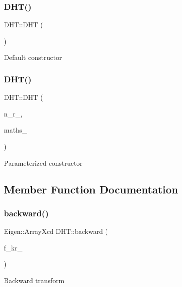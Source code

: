 \subsubsection{\texorpdfstring{D\+H\+T()}{DHT()}\hspace{0.1cm}{\footnotesize\ttfamily [1/2]}}
{\footnotesize\ttfamily D\+H\+T\+::\+D\+HT (\begin{DoxyParamCaption}{ }\end{DoxyParamCaption})}

Default constructor \mbox{\label{class_d_h_t_a9f6e442f2bc6f1e2f5d2dd2a3f9a557d}} 
\subsubsection{\texorpdfstring{D\+H\+T()}{DHT()}\hspace{0.1cm}{\footnotesize\ttfamily [2/2]}}
{\footnotesize\ttfamily D\+H\+T\+::\+D\+HT (\begin{DoxyParamCaption}\item[{int}]{n\+\_\+r\+\_\+,  }\item[{\hyperlink{classmaths__textbook}{maths\+\_\+textbook} \&}]{maths\+\_\+ }\end{DoxyParamCaption})}

Parameterized constructor 

\subsection{Member Function Documentation}
\mbox{\label{class_d_h_t_a923f3d375e55f2dbdab2763de372f440}} 
\subsubsection{\texorpdfstring{backward()}{backward()}}
{\footnotesize\ttfamily Eigen\+::\+Array\+Xcd D\+H\+T\+::backward (\begin{DoxyParamCaption}\item[{Eigen\+::\+Array\+Xcd}]{f\+\_\+kr\+\_\+ }\end{DoxyParamCaption})}

Backward transform \mbox{\label{class_d_h_t_a916089f65c6ad05eace5e1f9854f50f4}} 
